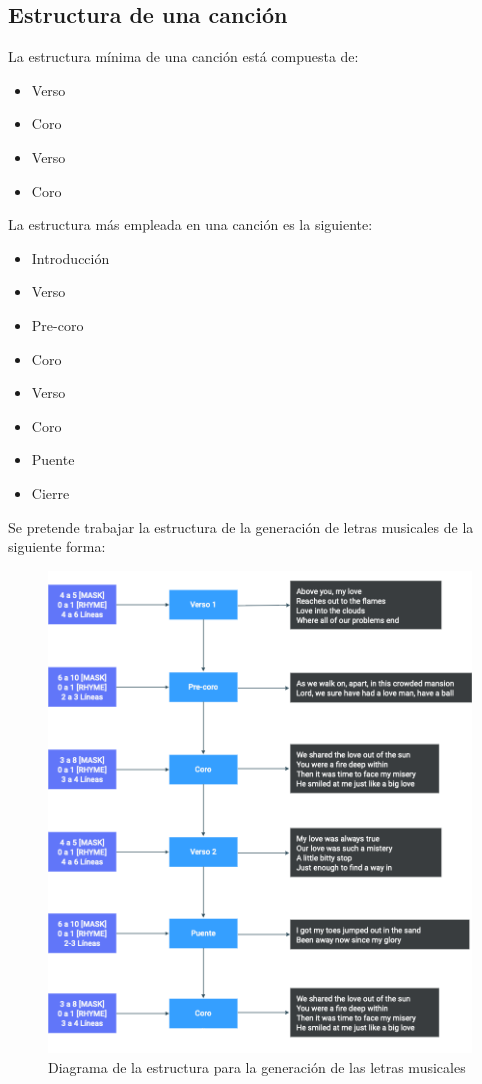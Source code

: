 \documentclass[12pt, a4paper, titlepage]{report}
\begin{document}
			\subsection{Estructura de una canción}
			La estructura mínima de una canción está compuesta de:\par
			\begin{itemize}
			  \item Verso
			  \item Coro
			  \item Verso
			  \item Coro
			\end{itemize}\par
			La estructura más empleada en una canción es la siguiente:
			\begin{itemize}
			  \item Introducción
			  \item Verso
			  \item Pre-coro
			  \item Coro
			  \item Verso
			  \item Coro
			  \item Puente
			  \item Cierre
			\end{itemize}
		
			Se pretende trabajar la estructura de la generación de letras musicales de la siguiente forma:
			
			\begin{figure}[H] 
				\includegraphics[scale=.45]{./imagenes/Disenio/Arquitectura/Generacion_letras.png}
				\centering 
				\caption{Diagrama de la estructura para la generación de las letras musicales}
			\end{figure}
		
\end{document}
